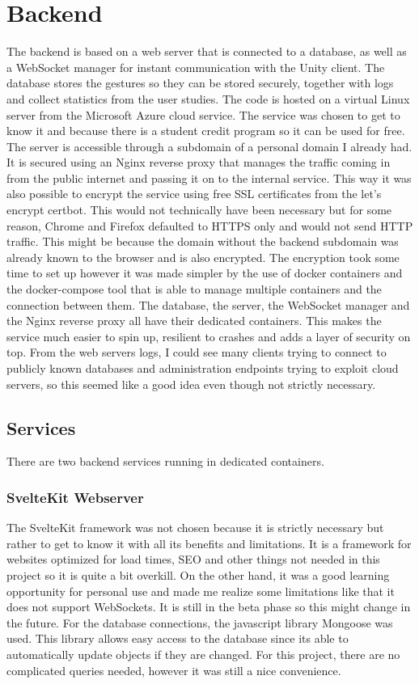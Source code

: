 
\section{Backend}
The backend is based on a web server that is connected to a database, as well as a WebSocket manager for instant communication with the Unity client. The database stores the gestures so they can be stored securely, together with logs and collect statistics from the user studies. The code is hosted on a virtual Linux server from the Microsoft Azure cloud service. The service was chosen to get to know it and because there is a student credit program so it can be used for free. The server is accessible through a subdomain of a personal domain I already had. It is secured using an Nginx reverse proxy that manages the traffic coming in from the public internet and passing it on to the internal service. This way it was also possible to encrypt the service using free SSL certificates from the let's encrypt certbot. This would not technically have been necessary but for some reason, Chrome and Firefox defaulted to HTTPS only and would not send HTTP traffic. This might be because the domain without the backend subdomain was already known to the browser and is also encrypted. The encryption took some time to set up however it was made simpler by the use of docker containers and the docker-compose tool that is able to manage multiple containers and the connection between them. The database, the server, the WebSocket manager and the Nginx reverse proxy all have their dedicated containers. This makes the service much easier to spin up, resilient to crashes and adds a layer of security on top. From the web servers logs, I could see many clients trying to connect to publicly known databases and administration endpoints trying to exploit cloud servers, so this seemed like a good idea even though not strictly necessary. 

\subsection{Services}
There are two backend services running in dedicated containers.

\subsubsection{SvelteKit Webserver}
The SvelteKit framework was not chosen because it is strictly necessary but rather to get to know it with all its benefits and limitations. It is a framework for websites optimized for load times, SEO and other things not needed in this project so it is quite a bit overkill. On the other hand, it was a good learning opportunity for personal use and made me realize some limitations like that it does not support WebSockets. It is still in the beta phase so this might change in the future. For the database connections, the javascript library Mongoose was used. This library allows easy access to the database since its able to automatically update objects if they are changed. For this project, there are no complicated queries needed, however it was still a nice convenience. 

